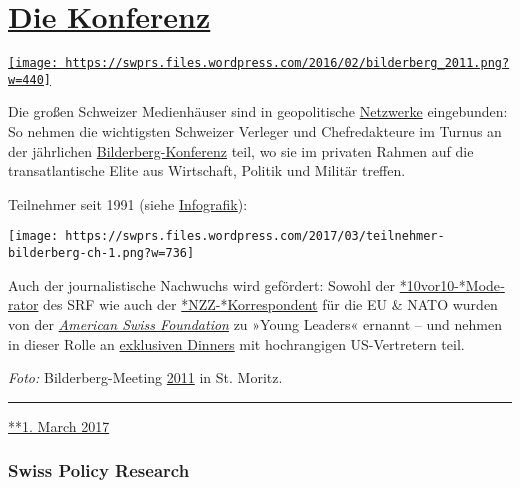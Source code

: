 \hypertarget{die-konferenz}{%
\section{\texorpdfstring{\href{https://swprs.org/2017/03/01/schweizer-medien-bilderberg-konferenz/}{Die
Konferenz}}{Die Konferenz}}\label{die-konferenz}}

\href{https://swprs.org/2017/03/01/schweizer-medien-bilderberg-konferenz/}{\texttt{[image: https://swprs.files.wordpress.com/2016/02/bilderberg\_2011.png?w=440]}}

Die großen Schweizer Medien­­häuser sind in geo­poli­tische
\href{https://swprs.org/netzwerk-medien-schweiz/}{Netz­werke}
ein­ge­bun­den: So nehmen die wichtigsten Schweizer Verleger und
Chef­redakteure im Turnus an der jähr­lichen
\href{http://www.bilderbergmeetings.org/}{Bilderberg-Konferenz} teil, wo
sie im privaten Rahmen auf die trans­atlan­tische Elite aus
Wirt­schaf‌t, Politik und Militär treffen.

Teilnehmer seit 1991 (siehe
\href{https://swprs.org/netzwerk-medien-schweiz/}{Info­grafik}):

\texttt{[image: https://swprs.files.wordpress.com/2017/03/teilnehmer-bilderberg-ch-1.png?w=736]}

Auch der journa­lis­tische Nach­wuchs wird ge­för­dert: Sowohl der
\href{http://www.americanswiss.org/news/arthur-honegger-spotlight/}{*10vor10-*​Mode­ra­tor}
des SRF wie auch der
\href{http://www.americanswiss.org/news/niklaus-nuspliger-spotlight/}{*NZZ-*Korres­pon­dent}
für die EU \& NATO wurden von der
\href{http://www.americanswiss.org/}{\emph{Ameri­can Swiss
Foun­da­tion}} zu »Young Leaders« ernannt -- und neh­men in dieser Rolle
an
\href{http://www.americanswiss.org/ambassador-barras-hosts-dinner-for-young-leaders-1/}{exklu­siven
Dinners} mit hoch­rang­igen US-Ver­tre­tern teil.

\emph{Foto:} Bilder­berg-Meeting
\href{https://www.theguardian.com/world/gallery/2011/jun/15/bilderberg-in-pictures}{2011}
in St. Moritz.

\begin{center}\rule{0.5\linewidth}{\linethickness}\end{center}

\href{https://swprs.org/2017/03/01/schweizer-medien-bilderberg-konferenz/}{**1.
March 2017}

\hypertarget{swiss-policy-research}{%
\subsubsection{Swiss Policy Research}\label{swiss-policy-research}}

